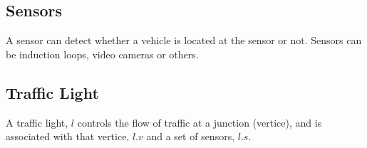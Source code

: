 \subsection{Sensors}
A sensor can detect whether a vehicle is located at the sensor or not. Sensors can be induction loops, video cameras or others.

\subsection{Traffic Light}
A traffic light, $l$ controls the flow of traffic at a junction (vertice), and is associated with that vertice, $l.v$ and a set of sensors, $l.s$.





